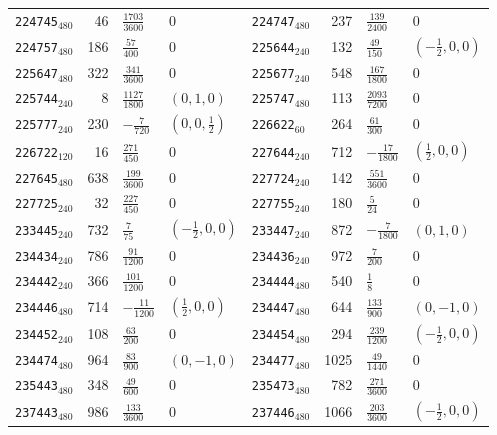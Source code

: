 {\begin{longtable}{@{}lrll@{\hspace{2em}}lrll@{}}
\texttt{224745}$_{480}$ & 46 & $\tfrac{1703}{3600}$ & 0 & \texttt{224747}$_{480}$ & 237 & $\tfrac{139}{2400}$ & 0\\
\texttt{224757}$_{480}$ & 186 & $\tfrac{57}{400}$ & 0 & \texttt{225644}$_{240}$ & 132 & $\tfrac{49}{150}$ & $(-\tfrac{1}{2},0,0)$\\
\texttt{225647}$_{480}$ & 322 & $\tfrac{341}{3600}$ & 0 & \texttt{225677}$_{240}$ & 548 & $\tfrac{167}{1800}$ & 0\\
\texttt{225744}$_{240}$ & 8 & $\tfrac{1127}{1800}$ & $(0,1,0)$ & \texttt{225747}$_{480}$ & 113 & $\tfrac{2093}{7200}$ & 0\\
\texttt{225777}$_{240}$ & 230 & $-\tfrac{7}{720}$ & $(0,0,\tfrac{1}{2})$ & \texttt{226622}$_{60}$ & 264 & $\tfrac{61}{300}$ & 0\\
\texttt{226722}$_{120}$ & 16 & $\tfrac{271}{450}$ & 0 & \texttt{227644}$_{240}$ & 712 & $-\tfrac{17}{1800}$ & $(\tfrac{1}{2},0,0)$\\
\texttt{227645}$_{480}$ & 638 & $\tfrac{199}{3600}$ & 0 & \texttt{227724}$_{240}$ & 142 & $\tfrac{551}{3600}$ & 0\\
\texttt{227725}$_{240}$ & 32 & $\tfrac{227}{450}$ & 0 & \texttt{227755}$_{240}$ & 180 & $\tfrac{5}{24}$ & 0\\
\texttt{233445}$_{240}$ & 732 & $\tfrac{7}{75}$ & $(-\tfrac{1}{2},0,0)$ & \texttt{233447}$_{240}$ & 872 & $-\tfrac{7}{1800}$ & $(0,1,0)$\\
\texttt{234434}$_{240}$ & 786 & $\tfrac{91}{1200}$ & 0 & \texttt{234436}$_{240}$ & 972 & $\tfrac{7}{200}$ & 0\\
\texttt{234442}$_{240}$ & 366 & $\tfrac{101}{1200}$ & 0 & \texttt{234444}$_{480}$ & 540 & $\tfrac{1}{8}$ & 0\\
\texttt{234446}$_{480}$ & 714 & $-\tfrac{11}{1200}$ & $(\tfrac{1}{2},0,0)$ & \texttt{234447}$_{480}$ & 644 & $\tfrac{133}{900}$ & $(0,-1,0)$\\
\texttt{234452}$_{240}$ & 108 & $\tfrac{63}{200}$ & 0 & \texttt{234454}$_{480}$ & 294 & $\tfrac{239}{1200}$ & $(-\tfrac{1}{2},0,0)$\\
\texttt{234474}$_{480}$ & 964 & $\tfrac{83}{900}$ & $(0,-1,0)$ & \texttt{234477}$_{480}$ & 1025 & $\tfrac{49}{1440}$ & 0\\
\texttt{235443}$_{480}$ & 348 & $\tfrac{49}{600}$ & 0 & \texttt{235473}$_{480}$ & 782 & $\tfrac{271}{3600}$ & 0\\
\texttt{237443}$_{480}$ & 986 & $\tfrac{133}{3600}$ & 0 & \texttt{237446}$_{480}$ & 1066 & $\tfrac{203}{3600}$ & $(-\tfrac{1}{2},0,0)$\\

\end{longtable}}
